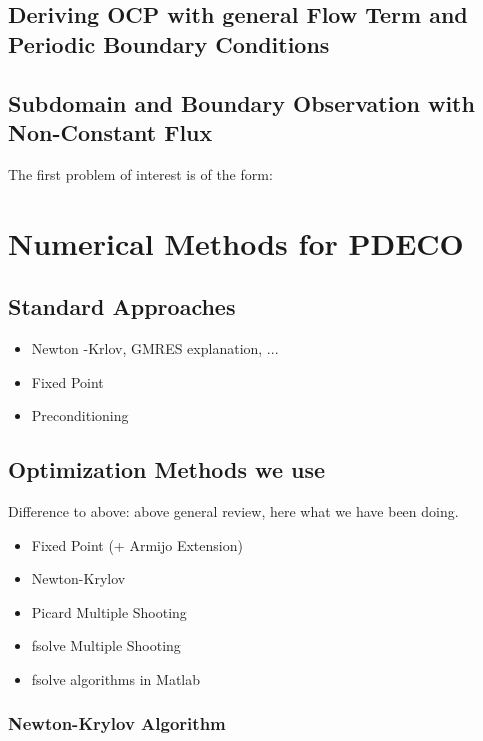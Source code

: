 \documentclass[11pt, a4paper]{article}
\theoremstyle{definition}
\begin{document}
	\subsection{Deriving OCP with general Flow Term and Periodic Boundary Conditions}
	
	
	\subsection{Subdomain and Boundary Observation with Non-Constant Flux}
	
	The first problem of interest is of the form:
	
	
		
	
	
	
	
	
	\section{Numerical Methods for PDECO}
	
	\subsection{Standard Approaches}
		\begin{itemize}
			\item Newton -Krlov, GMRES explanation, ...
			\item Fixed Point
			\item Preconditioning
		\end{itemize}
	
	\subsection{Optimization Methods we use}
	Difference to above: above general review, here what we have been doing.
		\begin{itemize}
			\item Fixed Point (+ Armijo Extension)
			\item Newton-Krylov
			\item Picard Multiple Shooting
			\item fsolve Multiple Shooting 
			\item fsolve algorithms in Matlab
		\end{itemize}
	
	\subsubsection{Newton-Krylov Algorithm}
\end{document}
